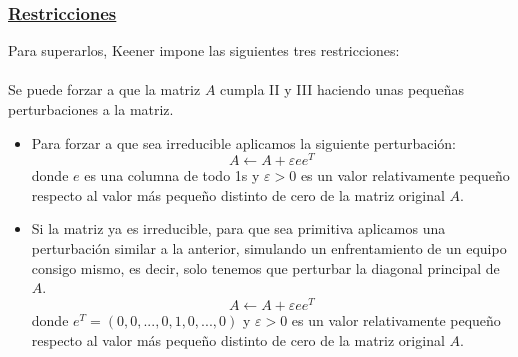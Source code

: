 \subsubsection*{\underline{Restricciones}}
Para superarlos, Keener impone las siguientes tres restricciones:\\
\ \\
Se puede forzar a que la matriz $A$ cumpla II y III haciendo unas pequeñas perturbaciones a la matriz.
\begin{itemize}
	\item Para forzar a que sea irreducible aplicamos la siguiente perturbación:
	\begin{equation*}
	A \leftarrow A + \varepsilon e e^{T}
	\end{equation*}
	donde $e$ es una columna de todo 1s y $\varepsilon>0$ es un valor relativamente pequeño respecto al valor más pequeño distinto de cero de la matriz original $A$.\\ 
	\item Si la matriz ya es irreducible, para que sea primitiva aplicamos una perturbación similar a la anterior, simulando un enfrentamiento de un equipo consigo mismo, es decir, solo tenemos que perturbar la diagonal principal de $A$.
	\begin{equation*}
	A \leftarrow A + \varepsilon e e^{T}
	\end{equation*}
	donde $e^{T} = \left( 0,0,...,0,1,0,...,0 \right) $ y $\varepsilon>0$ es un valor relativamente pequeño respecto al valor más pequeño distinto de cero de la matriz original $A$.\\
\end{itemize}

